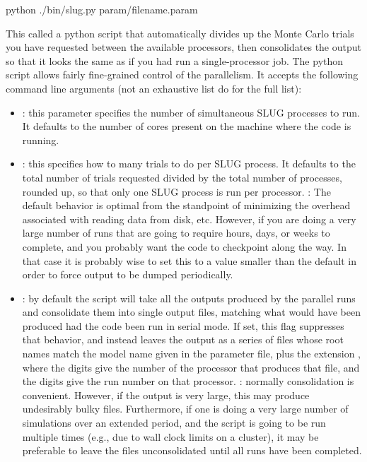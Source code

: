 \documentclass[letterpaper,10pt,english]{sphinxmanual}
\begin{document}
\begin{sphinxVerbatim}[commandchars=\\\{\}]
python ./bin/slug.py param/filename.param
\end{sphinxVerbatim}

This called a python script that automatically divides up the Monte Carlo trials you have requested between the available processors, then consolidates the output so that it looks the same as if you had run a single-processor job. The python script allows fairly fine-grained control of the parallelism. It accepts the following command line arguments (not an exhaustive list \textendash{} do  for the full list):
\begin{itemize}
\item {} 
: this parameter specifies the number of simultaneous SLUG processes to run. It defaults to the number of cores present on the machine where the code is running.

\item {} 
: this specifies how to many trials to do per SLUG process. It defaults to the total number of trials requested divided by the total number of processes, rounded up, so that only one SLUG process is run per processor. : The default behavior is optimal from the standpoint of minimizing the overhead associated with reading data from disk, etc. However, if you are doing a very large number of runs that are going to require hours, days, or weeks to complete, and you probably want the code to checkpoint along the way. In that case it is probably wise to set this to a value smaller than the default in order to force output to be dumped periodically.

\item {} 
: by default the  script will take all the outputs produced by the parallel runs and consolidate them into single output files, matching what would have been produced had the code been run in serial mode. If set, this flag suppresses that behavior, and instead leaves the output as a series of files whose root names match the model name given in the parameter file, plus the extension , where the digits  give the number of the processor that produces that file, and the digits  give the run number on that processor. : normally consolidation is convenient. However, if the output is very large, this may produce undesirably bulky files. Furthermore, if one is doing a very large number of simulations over an extended period, and the  script is going to be run multiple times (e.g., due to wall clock limits on a cluster), it may be preferable to leave the files unconsolidated until all runs have been completed.

\end{itemize}
\end{document}
